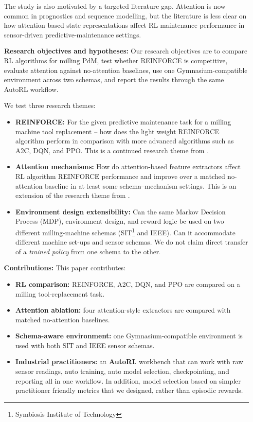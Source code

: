 \documentclass[sn-basic]{sn-jnl}%
\begin{document}
The study is also motivated by a targeted literature gap. Attention is now common in prognostics and sequence modelling, but the literature is less clear on how attention-based state representations affect RL maintenance performance in sensor-driven predictive-maintenance settings.

\textbf{Research objectives and hypotheses:}
Our research objectives are to compare RL algorithms for milling PdM, test whether \textsc{REINFORCE} is competitive, evaluate attention against no-attention baselines, use one Gymnasium-compatible environment across two schemas, and report the results through the same AutoRL workflow.

We test three research themes:
\begin{itemize}
    \item \textbf{REINFORCE:} For the given predictive maintenance task for a milling machine tool replacement -- how does the light weight \textsc{REINFORCE} algorithm perform in comparison with more advanced algorithms such as \textsc{A2C}, \textsc{DQN}, and \textsc{PPO}. This is a continued research theme from \cite{Siraskar2025}.
	\item \textbf{Attention mechanisms:} How do attention-based feature extractors affect RL algorithm \textsc{REINFORCE} performance and improve over a matched no-attention baseline in at least some schema--mechanism settings. This is an extension of the research theme from \cite{Siraskar2024}.
	\item \textbf{Environment design extensibility:} Can the same Markov Decision Process (MDP), environment design, and reward logic be used on two different milling-machine schemas (SIT\footnote{Symbiosis Institute of Technology} and IEEE). Can it accommodate different machine set-ups and sensor schemas. We do not claim direct transfer of a \emph{trained policy} from one schema to the other.
\end{itemize}

\textbf{Contributions:}
This paper contributes:
\begin{itemize}
    \item \textbf{RL comparison:} \textsc{REINFORCE}, \textsc{A2C}, \textsc{DQN}, and \textsc{PPO} are compared on a milling tool-replacement task.
    \item \textbf{Attention ablation:} four attention-style extractors are compared with matched no-attention baselines.
    \item \textbf{Schema-aware environment:} one Gymnasium-compatible environment is used with both SIT and IEEE sensor schemas.
    \item \textbf{Industrial practitioners:} an \textbf{AutoRL} workbench that can work with raw sensor readings, auto training, auto model selection, checkpointing, and reporting all in one workflow. In addition, model selection based on simpler practitioner friendly metrics that we designed, rather than episodic rewards. 
\end{itemize}
\end{document}
